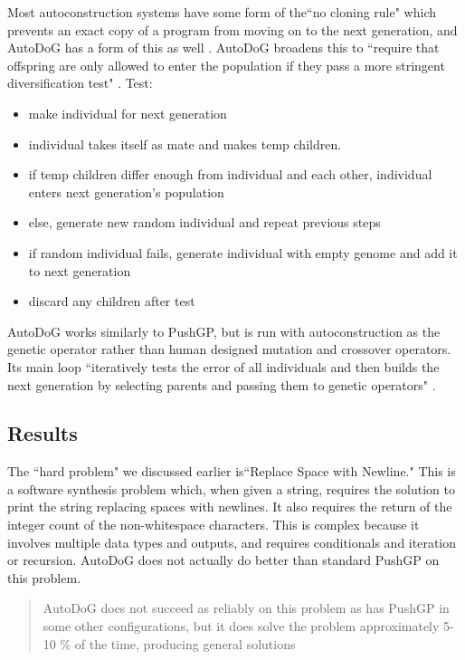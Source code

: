 \documentclass{sig-alternate}
\begin{document}
Most autoconstruction systems have some form of the``no cloning rule" which prevents an exact copy of a program from moving on to the next generation, and AutoDoG has a form of this as well \cite{spector:2016}. AutoDoG broadens this to ``require that offspring are only allowed to enter the population if they pass a more stringent diversification test" \cite{spector:2016}.
Test:
\begin{itemize}
	\item make individual for next generation
	\item individual takes itself as mate and makes temp children.
	\item if temp children differ enough from individual and each other, individual enters next generation's population
	\item else, generate new random individual and repeat previous steps
	\item if random individual fails, generate individual with empty genome and add it to next generation
	\item discard any children after test
\end{itemize}

AutoDoG works similarly to PushGP, but is run with autoconstruction as the genetic operator rather than human designed mutation and crossover operators. Its main loop ``iteratively tests the error of all individuals and then builds the next generation by selecting parents and passing them to genetic operators" \cite{spector:2016}.


\subsection{Results}
\label{sec:results}
The ``hard problem" we discussed earlier is``Replace Space with Newline." This is a software synthesis problem which, when given a string, requires the solution to print the string replacing spaces with newlines. It also requires the return of the integer count of the non-whitespace characters. This is complex because it involves multiple data types and outputs, and requires conditionals and iteration or recursion.
AutoDoG does not actually do better than standard PushGP on this problem.
\begin{quotation}
	AutoDoG does not succeed as reliably on this problem as has PushGP in some other configurations, but it does solve the problem approximately 5-10 \% of the time, producing general solutions \cite{spector:2016}
\end{quotation}
\end{document}
